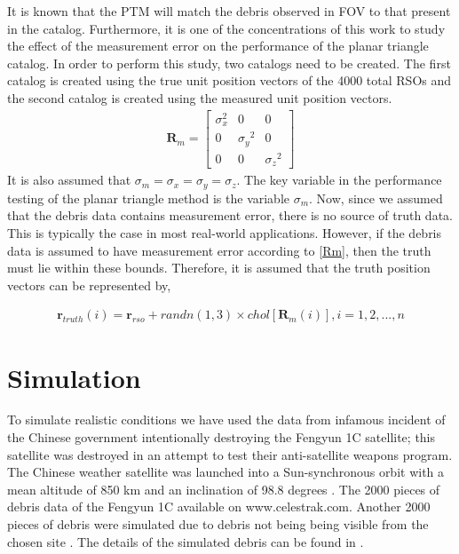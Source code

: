\documentclass[]{aiaa-tc}%
\begin{document}
It is known that the PTM will match the debris observed in FOV to that present in the catalog. Furthermore, it is one of the concentrations of this work to study the effect of the measurement
error on the performance of the planar triangle catalog. In order to perform this study, two catalogs
need to be created. The first catalog is created using the true unit position vectors of the 4000 total
RSOs and the second catalog is created using the measured unit position vectors.
\begin{align}
\label{Rm}
\textbf{R}_{m} = 
\begin{bmatrix}
\sigma_x^2 & 0 & 0\\
0 & {\sigma_y}^2  & 0\\
0 & 0 & {\sigma_z}^2
\end{bmatrix}
\end{align}
It is also assumed that $ \sigma_m = \sigma_x = \sigma_y = \sigma_z$.  The key variable in the performance
testing of the planar triangle method is the variable $\sigma_m$. Now, since we assumed that the debris data contains measurement error, there is no source of truth data. This is typically the case in most real-world applications. However, if the debris data is assumed to have measurement error according to \eqref{Rm}, then the truth must lie within these
bounds. Therefore, it is assumed that the truth position vectors can be represented by,

\begin{align}
\textbf{r}_{truth}(i) = \textbf{r}_{rso} + randn(1,3) \times chol[\textbf{R}_m(i)], i = 1,2,...,n
\end{align}


\section{Simulation}

To simulate realistic conditions we have used the data from infamous incident of the Chinese government intentionally destroying the Fengyun 1C satellite; this satellite was destroyed in  an attempt to test their anti-satellite weapons program.  The Chinese weather satellite was launched into a Sun-synchronous orbit with a mean altitude of 850 km and an inclination of 98.8 degrees \cite{johnson_characteristics_2008}. The 2000 pieces of debris data of the Fengyun 1C available on www.celestrak.com. Another 2000 pieces of debris were simulated due to debris not being  being visible from the chosen site \cite{silversmith}. The details of the simulated debris can be found in \cite{silversmith}.\\
\end{document}
